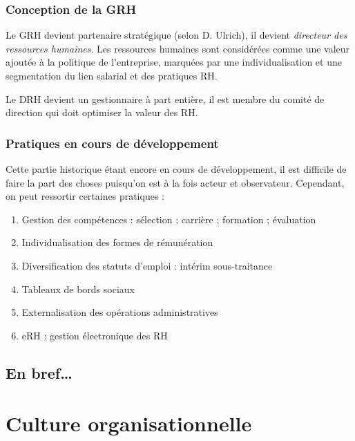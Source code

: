 \documentclass[12pt]{article}
\begin{document}
		\subsubsection{Conception de la GRH}
		
		Le GRH devient \og{} partenaire stratégique \fg{} (selon D. Ulrich), il devient \emph{directeur des ressources humaines}. Les ressources humaines sont considérées comme une valeur ajoutée à la politique de l'entreprise, marquées par une individualisation et une segmentation du lien salarial et des pratiques RH.
		
		Le DRH devient un gestionnaire à part entière, il est membre du comité de direction qui doit optimiser la valeur des RH.
		
		\subsubsection{Pratiques en cours de développement}
		
		Cette partie historique étant encore en cours de développement, il est difficile de faire la part des choses puisqu'on est à la fois acteur et observateur. Cependant, on peut ressortir certaines pratiques :
		
		\begin{enumerate}
		 \item Gestion des compétences :
		    \subitem sélection ;
		    \subitem carrière ;
		    \subitem formation ;
		    \subitem évaluation
		 \item Individualisation des formes de rémunération
		 \item Diversification des statuts d'emploi :
		    \subitem intérim
		    \subitem sous-traitance
		 \item Tableaux de bords sociaux
		 \item Externalisation des opérations administratives
		 \item eRH : gestion électronique des RH
		\end{enumerate}

		
	\subsection{En bref…}
	

\section{Culture organisationnelle}
\end{document}
